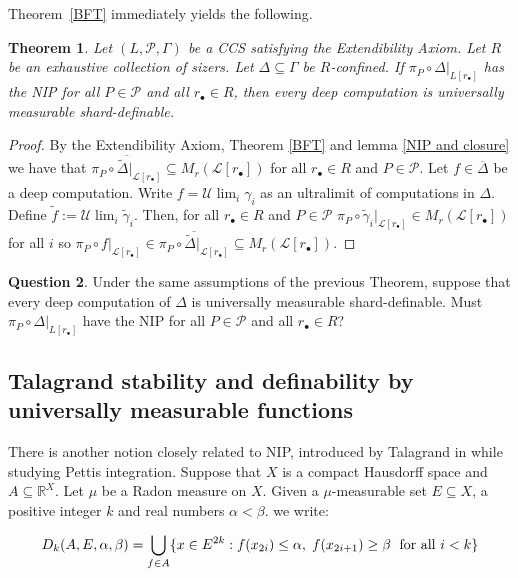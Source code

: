 \documentclass[psamsfonts]{amsart}
\newtheorem{thm}{Theorem}[section]
\theoremstyle{definition}
\newtheorem{question}[thm]{Question}
\theoremstyle{remark}
\numberwithin{equation}{section}
\begin{document}
Theorem~\ref{BFT} immediately yields the following.

\begin{thm}
    Let $(L,\mathcal P,\Gamma)$ be a CCS satisfying the Extendibility Axiom. Let $R$ be an exhaustive collection of sizers. Let $\Delta\subseteq\Gamma$ be $R$-confined. If $\pi_P\circ\Delta|_{L[r_\bullet]}$ has the NIP for all $P\in\mathcal{P}$ and all $r_{\bullet}\in R$, then every deep computation is universally measurable shard-definable.
\end{thm}

\begin{proof}
    By the Extendibility Axiom, Theorem \ref{BFT} and lemma \ref{NIP and closure} we have that $\overline{\pi_P\circ\tilde\Delta|_{\mathcal{L}[r_\bullet]}}\subseteq M_r(\mathcal{L}[r_\bullet])$ for all $r_\bullet\in R$ and $P\in\mathcal{P}$. Let $f\in\overline{\Delta}$ be a deep computation. Write $f=\mathcal{U}\lim_i\gamma_i$ as an ultralimit of computations in $\Delta$. Define $\tilde f:=\mathcal{U}\lim_i\tilde\gamma_i$. Then, for all $r_\bullet\in R$ and $P\in\mathcal{P}$ $\pi_P \circ \tilde\gamma_i|_{\mathcal{L}[r_\bullet]}\in M_r(\mathcal{L}[r_\bullet])$ for all $i$ so $\pi_P \circ f|_{\mathcal{L}[r_\bullet]}\in \overline{\pi_P\circ\tilde\Delta|_{\mathcal{L}[r_\bullet]}}\subseteq M_r(\mathcal{L}[r_\bullet])$.
\end{proof}

\begin{question}
Under the same assumptions of the previous Theorem, suppose that every deep computation of $\Delta$ is universally measurable shard-definable. Must $\pi_P\circ\Delta|_{L[r_\bullet]}$ have the NIP for all $P\in\mathcal{P}$ and all $r_{\bullet}\in R$?
\end{question}

\subsection{Talagrand stability and definability by universally measurable functions}

There is another notion closely related to NIP, introduced by Talagrand in \cite{talagrand1984pettis} while studying Pettis integration. Suppose that $X$ is a compact Hausdorff space and $A\subseteq \mathbb{R}^X$. Let $\mu$ be a Radon measure on $X$. Given a $\mu$-measurable set $E\subseteq X$, a positive integer $k$ and real numbers $\alpha<\beta$. we write:

$$D_k(A,E,\alpha,\beta)=\bigcup_{f\in A}\{x\in E^{2k}:f(x_{2i})\leq\alpha, \hspace{1mm} f(x_{2i+1})\geq\beta \hspace{1mm}{\text{ for all }i<k} \}$$
\end{document}
